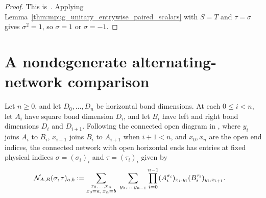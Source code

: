 \begin{proof}\leanok
    This is~\cite[``Sign dichotomy in the self
        relation'']{QICLean2026Blueprint}.
    Applying Lemma~\ref{thm:mpug_unitary_entrywise_paired_scalars} with $S=T$
    and $\tau=\sigma$ gives $\sigma^2=1$, so
    $\sigma=1$ or $\sigma=-1$.
\end{proof}

\section{A nondegenerate alternating-network comparison}
\label{sec:mpug_alternating_network}

\begin{definition}
    \label{def:mpug_open_alternating_network}
    \leanok
    Let $n\geq 0$, and let $D_0,\ldots,D_n$ be horizontal bond dimensions.  At each
    $0\leq i<n$, let $A_i$ have square bond dimension $D_i$, and let $B_i$ have
    left and right bond dimensions $D_i$ and $D_{i+1}$.  Following the
    connected open diagram in
    \cite[lines~2299--2361]{FrancoRubio2025MPUGauging}, where $y_i$ joins $A_i$
    to $B_i$, $x_{i+1}$ joins $B_i$ to $A_{i+1}$ when $i+1<n$, and $x_0,x_n$
    are the open end indices, the connected network with open horizontal ends
    has entries at fixed physical indices $\sigma=(\sigma_i)_i$ and
    $\tau=(\tau_i)_i$ given by
    \begin{align}
        \mathcal N_{A,B}(\sigma,\tau)_{a,b}
         & :=\sum_{\substack{x_0,\ldots,x_n \\
                x_0=a,\,x_n=b}}
        \ \sum_{y_0,\ldots,y_{n-1}}
        \prod_{i=0}^{n-1}
        (A_i^{\sigma_i})_{x_i,y_i}
        (B_i^{\tau_i})_{y_i,x_{i+1}}.
        \notag
    \end{align}
\end{definition}


